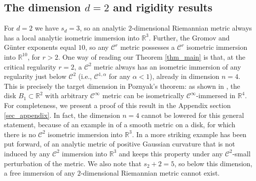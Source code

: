 \documentclass[reqno,twoside,11pt]{amsart}
\newcommand{\R}{\mathbb{R}}
\numberwithin{equation}{section}
\theoremstyle{plain}
\theoremstyle{definition}
\begin{document}
\medskip

\subsection{The dimension $d=2$ and rigidity results} 

For $d=2$ we have $s_d=3$, so an analytic $2$-dimensional Riemannian
metric always has a local analytic isometric immersion into $\R^3$. Further, the Gromov
and G\"unter exponents equal $10$, so any $\mathcal{C}^r$ metric possesses a
$\mathcal{C}^r$ isometric immersion into $\R^{10}$, for $r>2$. One way
of reading our Theorem \ref{thm_main} is that, at the critical
regularity $r=2$, a $\mathcal{C}^2$ metric
always has an isometric immersion of any regularity just below
$\mathcal{C}^2$ (i.e., $\mathcal{C}^{1,\alpha}$ for any $\alpha<1$),
already in dimension $n=4$. This is precisely the target dimension in
Poznyak's theorem: as shown in \cite{Poz}, the disk $B_1\subset\R^2$ with arbitrary
$\mathcal{C}^\infty$ metric can be isometrically
$\mathcal{C}^\infty$-immersed in $\R^4$. For completeness, we present
a proof of this result in the Appendix section \ref{sec_appendix}.
In fact, the dimension $n=4$ cannot be lowered for this general
statement, because of an example in \cite{Poz} of a smooth metric
on a disk, for which there is no $\mathcal{C}^2$ isometric immersion
into $\R^3$. In \cite{GroRokh} a more striking example has been put forward, of an
analytic metric of positive Gaussian curvature that is not induced by any
$\mathcal{C}^2$ immersion into $\R^3$ and keeps this property under
any $\mathcal{C}^2$-small perturbation of the metric. We also note that 
$s_2+2 =5$, so below this dimension, a free immersion of any
$2$-dimensional Riemannian metric cannot exist. 

\medskip
\end{document}
